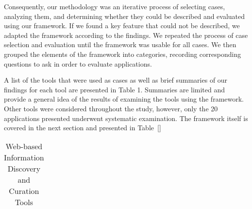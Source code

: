 {Consequently, our methodology was an iterative process of selecting cases, analyzing them, and determining whether they could be described and evaluated using our framework. If we found a key feature that could not be described, we adapted the framework according to the findings. We repeated the process of case selection and evaluation until the framework was usable for all cases. We then grouped the elements of the framework into categories, recording corresponding questions to ask in order to evaluate applications. 

A list of the tools that were used as cases as well as brief summaries of our findings for each tool are presented in Table 1. Summaries are limited and provide a general idea of the results of examining the tools using the framework. Other tools were considered throughout the study, however, only the 20 applications presented underwent systematic examination. The framework itself is covered in the next section and presented in Table~\ref{} 

\begin{table*}[htbp]
\small
\label{table:tools}
\caption{Web-based Information Discovery and Curation Tools}

\begin{tabular}{|p{0.20\linewidth}| p{0.30\linewidth}| p{0.45\linewidth}|}


\end{tabular}
\end{table*}}
